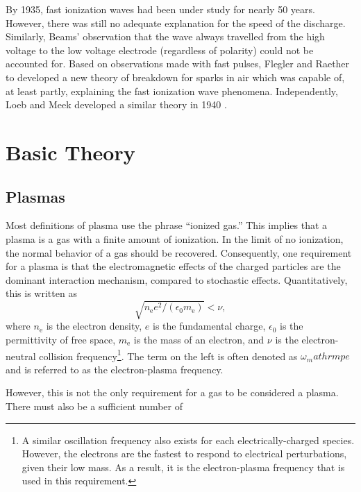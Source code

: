 By 1935, fast ionization waves had been under study for nearly 50 years.
However, there was still no adequate explanation for the speed of the discharge.
Similarly, Beams' observation that the wave always travelled from the high
voltage to the low voltage electrode (regardless of polarity) could not be
accounted for. Based on observations made with fast pulses, Flegler and Raether
to developed a new theory of breakdown for sparks in air \cite{Flegler1936}
which was capable of, at least partly, explaining the fast ionization wave
phenomena. Independently, Loeb and Meek developed a similar theory in 1940
\cite{Loeb1940}.


\section{Basic Theory}

\subsection{Plasmas}

Most definitions of plasma use the phrase ``ionized gas.'' This implies that a
plasma is a gas with a finite amount of ionization. In the limit of no
ionization, the normal behavior of a gas should be recovered. Consequently, one
requirement for a plasma is that the electromagnetic effects of the charged
particles are the dominant interaction mechanism, compared to stochastic
effects. Quantitatively, this is written as
\begin{equation}
  \sqrt{n_\mathrm{e} e^2 / (\epsilon_0 m_\mathrm{e})} < \nu,
\end{equation}
where $n_\mathrm{e}$ is the electron density, $e$ is the fundamental charge,
$\epsilon_0$ is the permittivity of free space, $m_\mathrm{e}$ is the mass of an
electron, and $\nu$ is the electron-neutral collision frequency\footnote{A
similar oscillation frequency also exists for each electrically-charged species.
However, the electrons are the fastest to respond to electrical perturbations,
given their low mass. As a result, it is the electron-plasma frequency that is
used in this requirement.}. The term on the left is often denoted as
$\omega_mathrm{pe}$ and is referred to as the electron-plasma frequency.

However, this is not the only requirement for a gas to be considered a plasma.
There must also be a sufficient number of

